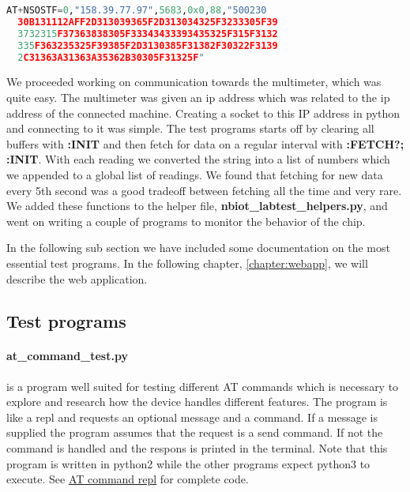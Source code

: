 \documentclass[USenglish]{ifimaster}  %
\begin{document}
\begin{lstlisting}[caption={Sample transmit 158.39.77.97:5683, 88 bytes},label={samplecommand},language=Python]
  AT+NSOSTF=0,"158.39.77.97",5683,0x0,88,"500230
  30B131112AFF2D313039365F2D313034325F3233305F39
  3732315F37363838305F33343433393435325F315F3132
  335F363235325F39385F2D3130385F31382F30322F3139
  2C31363A31363A35362B30305F31325F"
\end{lstlisting}

We proceeded working on communication towards the multimeter, which was quite easy. The multimeter was given an \acrshort{ip} address which was related to the \acrshort{ip} address of the connected machine. Creating a socket to this IP address in python and connecting to it was simple. The test programs starts off by clearing all buffers with \textbf{:INIT} and then fetch for data on a regular interval with \textbf{:FETCH?; :INIT}. With each reading we converted the string into a list of numbers which we appended to a global list of readings. We found that fetching for new data every 5th second was a good tradeoff between fetching all the time and very rare. We added these functions to the helper file, \textbf{nbiot\_labtest\_helpers.py}, and went on writing a couple of programs to monitor the behavior of the chip.

In the following sub section we have included some documentation on the most essential test programs. In the following chapter, \vref{chapter:webapp}, we will describe the web application.

\subsection{Test programs}
\paragraph{\textbf{at\_command\_test.py}} is a program well suited for testing different AT commands which is necessary to explore and research how the device handles different features. The program is like a \acrshort{repl} and requests an optional message and a command. If a message is supplied the program assumes that the request is a send command. If not the command is handled and the respons is printed in the terminal. Note that this program is written in python2 while the other programs expect python3 to execute. See \href{https://github.com/henninghaakonsen/thesis/blob/master/code/at_command_test.py}{AT command \acrshort{repl}}\cite{code:atcommand} for complete code.
\end{document}
